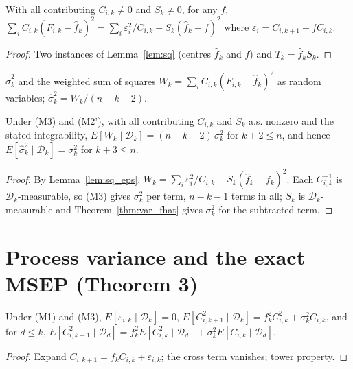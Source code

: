 \begin{lemma}\label{lem:sq_eps}\leanok
{}
With all contributing $C_{i,k} \neq 0$ and $S_k \neq 0$, for any $f$,
$\sum_i C_{i,k}(F_{i,k} - \hat f_k)^2 = \sum_i \varepsilon_{i}^2 / C_{i,k} - S_k(\hat f_k - f)^2$
where $\varepsilon_i = C_{i,k+1} - f C_{i,k}$.
\end{lemma}
\begin{proof}\leanok Two instances of Lemma~\ref{lem:sq} (centres $\hat f_k$ and $f$) and $T_k = \hat f_k S_k$. \end{proof}

\begin{definition}\label{def:sigma2Rv}\leanok
{}
$\hat\sigma_k^2$ and the weighted sum of squares $W_k = \sum_i C_{i,k}(F_{i,k} - \hat f_k)^2$ as
random variables; $\hat\sigma_k^2 = W_k/(n-k-2)$.
\end{definition}

\begin{theorem}\label{thm:sigma2}\leanok
{}
Under (M3) and (M2'), with all contributing $C_{i,k}$ and $S_k$ a.s. nonzero and the stated
integrability, $E[W_k \mid \mathcal{D}_k] = (n-k-2)\,\sigma_k^2$ for $k+2 \le n$, and hence
$E[\hat\sigma_k^2 \mid \mathcal{D}_k] = \sigma_k^2$ for $k + 3 \le n$.
\end{theorem}
\begin{proof}\leanok
By Lemma~\ref{lem:sq_eps}, $W_k = \sum_i \varepsilon_i^2/C_{i,k} - S_k(\hat f_k - f_k)^2$.
Each $C_{i,k}^{-1}$ is $\mathcal{D}_k$-measurable, so (M3) gives $\sigma_k^2$ per term, $n-k-1$
terms in all; $S_k$ is $\mathcal{D}_k$-measurable and Theorem~\ref{thm:var_fhat} gives
$\sigma_k^2$ for the subtracted term.
\end{proof}

\section{Process variance and the exact MSEP (Theorem 3)}

\begin{lemma}\label{lem:second_moment}\leanok
{}
Under (M1) and (M3), $E[\varepsilon_{i,k} \mid \mathcal{D}_k] = 0$,
$E[C_{i,k+1}^2 \mid \mathcal{D}_k] = f_k^2 C_{i,k}^2 + \sigma_k^2 C_{i,k}$, and for $d \le k$,
$E[C_{i,k+1}^2 \mid \mathcal{D}_d] = f_k^2 E[C_{i,k}^2 \mid \mathcal{D}_d] + \sigma_k^2 E[C_{i,k} \mid \mathcal{D}_d]$.
\end{lemma}
\begin{proof}\leanok Expand $C_{i,k+1} = f_k C_{i,k} + \varepsilon_{i,k}$; the cross term vanishes; tower property. \end{proof}

